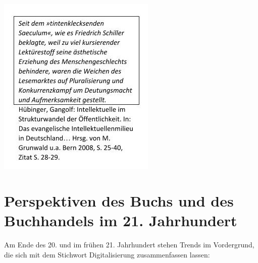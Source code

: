 \documentclass[a4paper,
fontsize=11pt,
oneside,
numbers=noperiodatend,
parskip=half-,
bibliography=totoc,
final
]{scrartcl}
\begin{document}
\begin{center}
\includegraphics{img/image2.jpg}
\end{center}

\hypertarget{perspektiven-des-buchs-und-des-buchhandels-im-21.-jahrhundert}{%
\section{Perspektiven des Buchs und des Buchhandels im 21.
Jahrhundert}\label{perspektiven-des-buchs-und-des-buchhandels-im-21.-jahrhundert}}

Am Ende des 20. und im frühen 21. Jahrhundert stehen Trends im
Vordergrund, die sich mit dem Stichwort Digitalisierung zusammenfassen
lassen:
\end{document}
